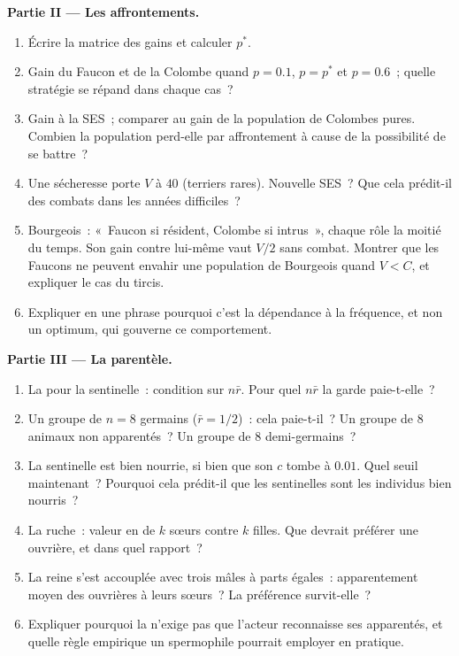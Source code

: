 \begin{problem}
\medskip
\noindent\textbf{Partie II --- Les affrontements.}
\begin{enumerate}[resume]
  \item Écrire la matrice des gains et calculer $p^{*}$.
  \item Gain du Faucon et de la Colombe quand $p = 0.1$, $p = p^{*}$ et $p =
        0.6$~; quelle stratégie se répand dans chaque cas~?
  \item Gain à la SES~; comparer au gain de la population de Colombes
        pures. Combien la population perd-elle par affrontement à cause
        de la possibilité de se battre~?
  \item Une sécheresse porte $V$ à $40$ (terriers rares). Nouvelle SES~?
        Que cela prédit-il des combats dans les années difficiles~?
  \item Bourgeois~: «~Faucon si résident, Colombe si intrus~», chaque
        rôle la moitié du temps. Son gain contre lui-même vaut $V/2$ sans
        combat. Montrer que les Faucons ne peuvent envahir une population
        de Bourgeois quand $V
        < C$, et expliquer le cas du tircis.
  \item Expliquer en une phrase pourquoi c'est la dépendance à la
        fréquence, et non un optimum, qui gouverne ce comportement.
\end{enumerate}

\medskip
\noindent\textbf{Partie III --- La parentèle.}
\begin{enumerate}[resume]
  \item La  pour la sentinelle~: condition sur $n\bar r$.
        Pour quel $n\bar r$ la garde paie-t-elle~?
  \item Un groupe de $n = 8$ germains ($\bar r = 1/2$)~: cela paie-t-il~?
        Un groupe de 8 animaux non apparentés~? Un groupe de 8
        demi-germains~?
  \item La sentinelle est bien nourrie, si bien que son $c$ tombe à
        $0.01$. Quel seuil maintenant~? Pourquoi cela prédit-il que les
        sentinelles sont les individus bien nourris~?
  \item La ruche~: valeur en  de $k$ sœurs
        contre $k$ filles. Que devrait préférer une ouvrière, et dans
        quel rapport~?
  \item La reine s'est accouplée avec trois mâles à parts égales~:
        apparentement moyen des ouvrières à leurs sœurs~? La préférence
        survit-elle~?
  \item Expliquer pourquoi la  n'exige pas que l'acteur
        reconnaisse ses apparentés, et quelle règle empirique un
        spermophile pourrait employer en pratique.
\end{enumerate}


\end{problem}
